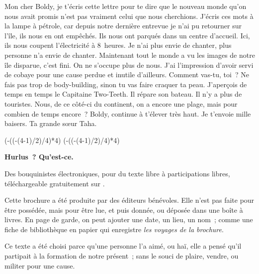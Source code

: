 \documentclass[twoside]{book} %
\newcommand{\dateline}[1]{\medskip{\RaggedLeft{#1}\par}\bigskip}
\def\truncdiv#1#2{((#1-(#2-1)/2)/#2)}
\def\moduloop#1#2{(#1-\truncdiv{#1}{#2}*#2)}
\def\modulo#1#2{\number\numexpr\moduloop{#1}{#2}\relax}
\begin{document}
\noindent Mon cher Boldy, je t’écris cette lettre pour te dire que le nouveau monde qu’on nous avait promis n’est pas vraiment celui que nous cherchions. J’écris ces mots à la lampe à pétrole, car depuis notre dernière entrevue je n’ai pu retourner sur l’île, ils nous en ont empêchés. Ils nous ont parqués dans un centre d’accueil. Ici, ils nous coupent l’électricité à 8 heures. Je n’ai plus envie de chanter, plus personne n’a envie de chanter. Maintenant tout le monde a vu les images de notre île disparue, c’est fini. On ne s’occupe plus de nous. J’ai l’impression d’avoir servi de cobaye pour une cause perdue et inutile d’ailleurs. Comment vas-tu, toi ? Ne fais pas trop de body-building, sinon tu vas faire craquer ta peau. J’aperçois de temps en temps le Capitaine Two-Teeth. Il répare son bateau. Il n’y a plus de touristes. Nous, de ce côté-ci du continent, on a encore une plage, mais pour combien de temps encore ? Boldy, continue à t’élever très haut. Je t’envoie mille baisers. Ta grande sœur Taha.\par

\dateline{Lille sept.oct. 2016}
 


\ifbooklet
  \pagestyle{empty}
  \clearpage
  \ifnum\modulo{\value{page}}{4}=0 \hbox{}\newpage\hbox{}\newpage\fi
  \ifnum\modulo{\value{page}}{4}=1 \hbox{}\newpage\hbox{}\newpage\fi


  \hbox{}\newpage
  \ifodd\value{page}\hbox{}\newpage\fi
  {\centering\color{rubric}\bfseries\noindent\large
    Hurlus ? Qu’est-ce.\par
    \bigskip
  }
  \noindent Des bouquinistes électroniques, pour du texte libre à participations libres,
  téléchargeable gratuitement sur \href{https://hurlus.fr}{}.\par
  \bigskip
  \noindent Cette brochure a été produite par des éditeurs bénévoles.
  Elle n’est pas faite pour être possédée, mais pour être lue, et puis donnée, ou déposée dans une boîte à livres.
  En page de garde, on peut ajouter une date, un lieu, un nom ;
  comme une fiche de bibliothèque en papier qui enregistre \emph{les voyages de la brochure}.
  \par

  Ce texte a été choisi parce qu’une personne l’a aimé,
  ou haï, elle a pensé qu’il partipait à la formation de notre présent ;
  sans le souci de plaire, vendre, ou militer pour une cause.
  \par
\end{document}
